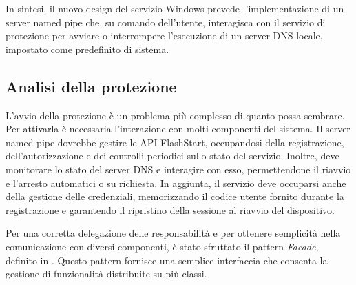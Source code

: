 \documentclass[12pt,a4paper,openright,twoside]{book}
\begin{document}
In sintesi, il nuovo design del servizio Windows prevede l'implementazione di un server named pipe che, su comando dell'utente, interagisca con il servizio di protezione per avviare o interrompere l'esecuzione di un server \gls{DNS} locale, impostato come predefinito di sistema.

\subsection{Analisi della protezione}

L'avvio della protezione è un problema più complesso di quanto possa sembrare.
Per attivarla è necessaria l'interazione con molti componenti del sistema.
Il server named pipe dovrebbe gestire le API FlashStart, occupandosi della registrazione, dell'autorizzazione e dei controlli periodici sullo stato del servizio.
Inoltre, deve monitorare lo stato del server \gls{DNS} e interagire con esso, permettendone il riavvio e l'arresto automatici o su richiesta. 
In aggiunta, il servizio deve occuparsi anche della gestione delle credenziali, memorizzando il codice utente fornito durante la registrazione e garantendo il ripristino della sessione al riavvio del dispositivo.

Per una corretta delegazione delle responsabilità e per ottenere semplicità nella comunicazione con diversi componenti, è stato sfruttato il pattern \textit{Facade}, definito in \cite{GoF94}.
Questo pattern fornisce una semplice interfaccia che consenta la gestione di funzionalità distribuite su più classi.
\end{document}
